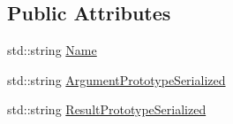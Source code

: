 \subsection*{Public Attributes}
\begin{DoxyCompactItemize}
\item 
std\-::string \hyperlink{classmts_command_write_return_description_a16e6828883401087c7e0f17487b5c717}{Name}
\item 
std\-::string \hyperlink{classmts_command_write_return_description_ade3f7334194ddd2b58c0d3808ef9f2ff}{Argument\-Prototype\-Serialized}
\item 
std\-::string \hyperlink{classmts_command_write_return_description_a37e964f55fdfe2df9b64d3e5767aa23b}{Result\-Prototype\-Serialized}
\end{DoxyCompactItemize}


